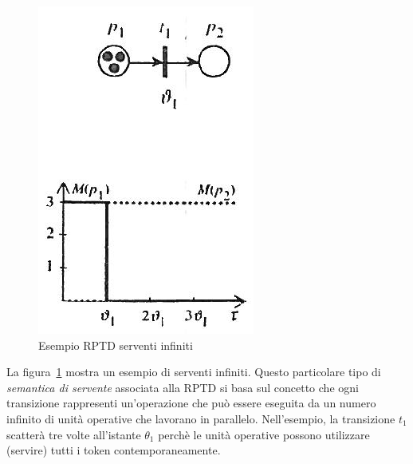 \documentclass[a4paper]{report}
\begin{document}
\begin{figure}[!h]
  \begin{center}
    \includegraphics[scale=0.4]{./images/rptd-serventiinfiniti.png}
    \caption{Esempio RPTD serventi infiniti}
    \label{fig:rptd-serventiinfiniti}
  \end{center}
\end{figure}
La figura~\ref{fig:rptd-serventiinfiniti} mostra un esempio di
serventi infiniti. Questo particolare tipo di {\em semantica di
  servente} associata alla RPTD si basa sul concetto che ogni
transizione rappresenti un'operazione che pu\`o essere eseguita da un
numero infinito di unit\`a operative che lavorano in
parallelo. Nell'esempio, la transizione $t_1$ scatter\`a tre volte
all'istante $\theta_1$ perch\`e le unit\`a operative possono
utilizzare (servire) tutti i token contemporaneamente.
\end{document}
